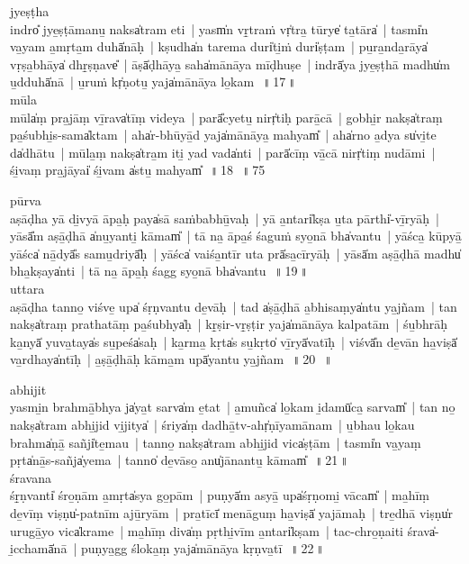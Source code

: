 \documentclass[parskip, DIV=14]{scrartcl}
\begin{document}
{jyeṣṭha  \\
indro̎ jye̱ṣṭāmanu̱ naksa̍tram eti~|  yasm̍n vṛ̱traṁ vṛ̍tra̱ tūrye̍ ta̱tāra̍~|  tasmi̍n va̱yam a̱mṛta̱m duhā̍nāḥ~|  kṣudha̍n tarema duri̍ti̱ṁ duri̍ṣṭam~|  pu̱ra̱nda̱rāya̍ vṛṣa̱bhāya̍ dhṛ̱ṣṇave̎~|  āṣā̍ḍhāya̱ saha̍mānāya mīḍhuṣe~|  indrā̍ya jye̱ṣṭhā madhu̍m u̱dduhā̍nā~|  u̱ruṁ kṛ̍ṇotu̱ yaja̍mānāya lo̱kam~\,॥\,17\,॥ \\

mūla  \\
mūla̍ṃ pra̱jāṃ vī̱rava̍tīṃ videya~|  parā̎cyetu̱ nirṛ̍tiḥ parā̱cā~|  gobhi̱r nakṣa̍traṃ pa̱śubhi̱s-sama̍ktam~|  aha̍r-bhūyā̱d yaja̍mānāya̱ mahyam̎~|  aha̍rno a̱dya su̍vi̱te da̍dhātu~|  mūla̱ṃ nakṣa̍tra̱m iti̱ yad vada̍nti~|  parā̍cīṃ vā̱cā nirṛ̍tiṃ nudāmi~|  śi̱vaṃ pra̱jāyai̍ śi̱vam a̍stu̱ mahyam̎~\,॥\,18~\,॥\,75

pūrva  \\
aṣāḍha yā di̱vyā āpa̱ḥ paya̍sā saṁbabhū̱vaḥ~|  yā a̱ntari̍kṣa u̱ta pārthi̍-vī̱ryāḥ~|  yāsā̎m aṣā̱ḍhā a̍nu̱yanti̱ kāmam̎~|  tā na̱ āpa̱ś śaguṁ syo̱nā bha̍vantu~|  yāśca̱ kūpyā̱ yāśca̍ nā̱dyā̎s samu̱driyā̎ḥ~|  yāśca̍ vaiśa̱ntīr uta prā̍sa̱cīryāḥ~|  yāsā̍m aṣā̱ḍhā madhu̍ bha̱kṣaya̍nti~|  tā na̱ āpa̱ḥ śagg syo̱nā bha̍vantu~\,॥\,19\,॥ \\

uttara  \\
aṣāḍha tanno̱ viśve̱ upa̍ śṛṇvantu de̱vāḥ~|  tad a̍ṣā̱ḍhā a̱bhisaṃya̍ntu ya̱jñam~|  tan nakṣa̍traṃ prathatāṃ pa̱śubhya̍ḥ~|  kṛ̱ṣir-vṛ̱ṣṭir yaja̍mānāya kalpatām~|  śu̱bhrāḥ ka̱nyā̍ yuva̱taya̍s su̱peśa̍saḥ~|  ka̱rma̱ kṛta̍s su̱kṛto̍ vī̱ryā̍vatīḥ~|  viśvā̎n de̱vān ha̱viṣā̍ va̱rdhaya̍ntīḥ~|  a̱ṣā̱ḍhāḥ kāma̱m upā̍yantu ya̱jñam~\,॥\,20~\,॥\,

abhijit  \\
yasmi̱n brahmā̱bhya ja̍ya̱t sarva̍m e̱tat~|  a̱muñca̍ lo̱kam i̱damū̍ca̱ sarvam̎~|  tan no̱ nakṣa̍tram abhi̱jid vi̱jitya̍~|  śriya̍ṃ dadhā̱tv-ahṛ̍ṇīyamānam~|  u̱bhau lo̱kau brahma̍ṇā̱ sañji̍te̱mau~|  tanno̱ nakṣa̍tram abhi̱jid vica̍ṣṭām~|  tasmi̍n va̱yaṃ pṛta̍nā̱s-sañja̍yema~|  tanno̍ de̱vāso̱ anu̍jānantu̱ kāmam̎~\,॥\,21\,॥ \\

śravana  \\
śṛ̱ṇvanti̍ śro̱ṇām a̱mṛta̍sya go̱pām~|  puṇyā̍m asyā̱ upa̍śṛṇomi̱ vācam̎~|  ma̱hīṃ de̱vīṃ viṣṇu̍-patnīm ajū̱ryām~|  pra̱tīcī̍ menāguṃ ha̱viṣā̍ yajāmaḥ~|  tre̱dhā viṣṇu̍r urugā̱yo vica̍krame~|  ma̱hīṃ diva̍ṃ pṛthi̱vīm a̱ntari̍kṣam~|  tac-chro̱ṇaiti śrava̍-i̱cchamā̍nā~|  puṇya̱gg śloka̱ṃ yaja̍mānāya kṛṇva̱tī~\,॥\,22\,॥ \\

}
\end{document}
